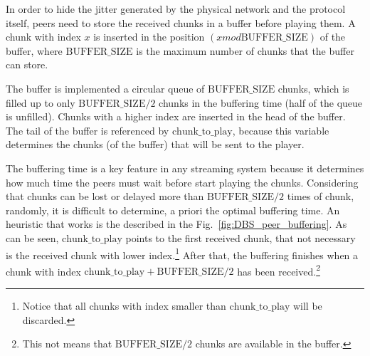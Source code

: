 
\label{sec:chunk_buffering}

In order to hide the jitter generated by the physical network and the
protocol itself, peers need to store the received chunks in a buffer
before playing them. A chunk with index $x$ is inserted in the
position $(x \mathit{mod} \text{BUFFER\_SIZE})$ of the buffer, where
$\text{BUFFER\_SIZE}$ is the maximum number of chunks that the
buffer can store.

\begin{figure*}
   \caption{Buffering of the
    chunks.\label{fig:DBS_peer_buffering}}
\end{figure*}

The buffer is implemented a circular queue of $\text{BUFFER\_SIZE}$
chunks, which is filled up to only $\text{BUFFER\_SIZE}/2$ chunks in
the buffering time (half of the queue is unfilled). Chunks with a
higher index are inserted in the head of the buffer. The tail of the
buffer is referenced by $\text{chunk\_to\_play}$, because this
variable determines the chunks (of the buffer) that will be sent to
the player.

The buffering time is a key feature in any streaming system because it
determines how much time the peers must wait before start playing the
chunks. Considering that chunks can be lost or delayed more than
$\text{BUFFER\_SIZE}/2$ times of chunk, randomly, it is difficult to
determine, a priori the optimal buffering time. An heuristic that
works is the described in the Fig.~\ref{fig:DBS_peer_buffering}. As
can be seen, $\text{chunk\_to\_play}$ points to the first received
chunk, that not necessary is the received chunk with lower
index.\footnote{Notice that all chunks with index smaller than
  $\text{chunk\_to\_play}$ will be discarded.} After that, the
buffering finishes when a chunk with index $\text{chunk\_to\_play} +
\text{BUFFER\_SIZE}/2$ has been received.\footnote{This not means that
  $\text{BUFFER\_SIZE}/2$ chunks are available in the buffer.}
